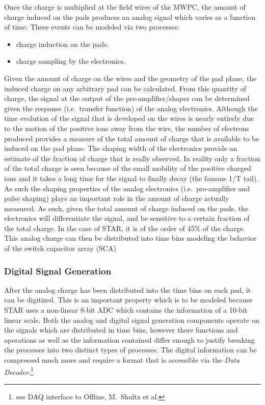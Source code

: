 \documentclass{article}
\begin{document}
Once the charge is multiplied at the field wires of the MWPC, the
amount of charge induced on the pads produces an analog signal which
varies as a function of time.  These events can be modeled via two 
processes:
\begin{itemize}
  \item charge induction on the pads.
  \item charge sampling by the electronics.
\end{itemize}
Given
the amount of charge on the wires and the geometry of the pad plane,
the induced charge on any arbitrary pad can be calculated.  From this
quantity of charge, the signal at the output of the pre-amplifier/shaper
can be determined given the response (i.e.~transfer function) of the
analog electronics.  Although the
time evolution of the signal that is developed on the wires is nearly 
entirely due to the motion of the positive ions away from the wire, 
the number of electrons produced provides a measure of the total amount
of charge that is available to be induced on the pad plane.  The shaping
width of the electronics provide an estimate of the fraction of charge
that is really observed.  In reality only a fraction of the total charge 
is seen because of the
small mobility of the positive charged ions and it takes a long
time for the signal to finally decay (the famous 1/T tail).
As such the shaping 
properties of the analog electronics (i.e.~pre-amplifier and pulse shaping)
plays an important role in the amount of charge actually measured.
As such, given the total amount of charge induced on the pads, the
electronics will differentiate the signal, and be sensitive to a 
certain fraction of the total charge.  In the case of STAR, it is of
the order of 45\% of the charge.  This analog charge can then be distributed
into time bins modeling the behavior of the switch capacitor array (SCA)

\subsubsection{Digital Signal Generation}
\label{sec:digitalSignalGeneration}

After the analog charge has been distributed into the time bins on
each pad, it can be digitized.  This is an important property which
is to be modeled because STAR uses a non-linear 8-bit ADC which
contains the information of a 10-bit linear scale.  Both the analog
and digital signal generation components operate on the signals
which are distributed in time bins, however there functions and operations
as well as the information contained differ enough to justify breaking 
the processes into two distinct types of processes.  The digital information
can be compressed much more and require a format that is accessible
via the {\em Data Decoder}.\footnote{see DAQ interface to Offline, M.~Shultz et al.}
\end{document}
